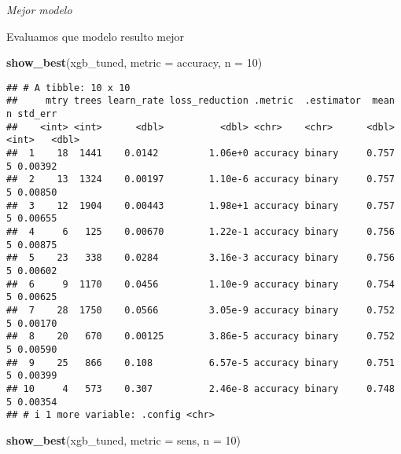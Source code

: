 \documentclass[
]{article}
\newenvironment{Shaded}{\begin{snugshade}}{\end{snugshade}}
\newcommand{\AttributeTok}[1]{\textcolor[rgb]{0.13,0.29,0.53}{#1}}
\newcommand{\DecValTok}[1]{\textcolor[rgb]{0.00,0.00,0.81}{#1}}
\newcommand{\FunctionTok}[1]{\textcolor[rgb]{0.13,0.29,0.53}{\textbf{#1}}}
\newcommand{\NormalTok}[1]{#1}
\newcommand{\StringTok}[1]{\textcolor[rgb]{0.31,0.60,0.02}{#1}}
\begin{document}
\emph{Mejor modelo}

Evaluamos que modelo resulto mejor

\begin{Shaded}
\begin{Highlighting}[]
\FunctionTok{show\_best}\NormalTok{(xgb\_tuned, }\AttributeTok{metric =} \StringTok{\textquotesingle{}accuracy\textquotesingle{}}\NormalTok{, }\AttributeTok{n =} \DecValTok{10}\NormalTok{)}
\end{Highlighting}
\end{Shaded}

\begin{verbatim}
## # A tibble: 10 x 10
##     mtry trees learn_rate loss_reduction .metric  .estimator  mean     n std_err
##    <int> <int>      <dbl>          <dbl> <chr>    <chr>      <dbl> <int>   <dbl>
##  1    18  1441    0.0142         1.06e+0 accuracy binary     0.757     5 0.00392
##  2    13  1324    0.00197        1.10e-6 accuracy binary     0.757     5 0.00850
##  3    12  1904    0.00443        1.98e+1 accuracy binary     0.757     5 0.00655
##  4     6   125    0.00670        1.22e-1 accuracy binary     0.756     5 0.00875
##  5    23   338    0.0284         3.16e-3 accuracy binary     0.756     5 0.00602
##  6     9  1170    0.0456         1.10e-9 accuracy binary     0.754     5 0.00625
##  7    28  1750    0.0566         3.05e-9 accuracy binary     0.752     5 0.00170
##  8    20   670    0.00125        3.86e-5 accuracy binary     0.752     5 0.00590
##  9    25   866    0.108          6.57e-5 accuracy binary     0.751     5 0.00399
## 10     4   573    0.307          2.46e-8 accuracy binary     0.748     5 0.00354
## # i 1 more variable: .config <chr>
\end{verbatim}

\begin{Shaded}
\begin{Highlighting}[]
\FunctionTok{show\_best}\NormalTok{(xgb\_tuned, }\AttributeTok{metric =} \StringTok{\textquotesingle{}sens\textquotesingle{}}\NormalTok{, }\AttributeTok{n =} \DecValTok{10}\NormalTok{)}
\end{Highlighting}
\end{Shaded}
\end{document}
